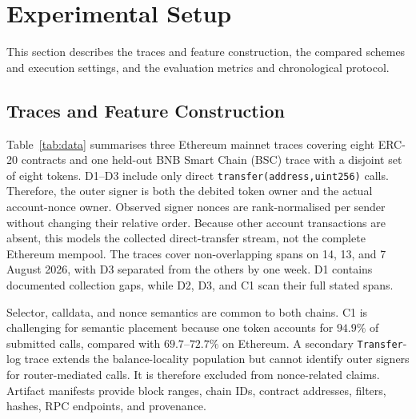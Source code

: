 \documentclass[runningheads]{llncs}
\begin{document}
\section{Experimental Setup}
\label{sec:setup}
\label{sec:method}

This section describes the traces and feature construction, the compared
schemes and execution settings, and the evaluation metrics and chronological
protocol.

\subsection{Traces and Feature Construction}

Table~\ref{tab:data} summarises three Ethereum mainnet traces covering eight
ERC-20 contracts and one held-out BNB Smart Chain (BSC) trace with a disjoint set of
eight tokens. D1--D3 include only direct
\texttt{transfer(address,uint256)} calls. Therefore, the outer signer is both
the debited token owner and the actual account-nonce owner. Observed signer
nonces are rank-normalised per sender without changing their relative order.
Because other account transactions are absent, this models the collected
direct-transfer stream, not the complete Ethereum mempool. The traces cover
non-overlapping spans on 14, 13, and 7 August 2026, with D3 separated from the
others by one week. D1 contains documented collection gaps, while D2, D3, and
C1 scan their full stated spans.

Selector, calldata, and nonce semantics are common to both chains. C1 is
challenging for semantic placement because one
token accounts for $94.9\%$ of submitted calls, compared with
$69.7$--$72.7\%$ on Ethereum. A secondary \texttt{Transfer}-log trace extends
the balance-locality population but cannot identify outer signers for
router-mediated calls. It is therefore excluded from nonce-related claims.
Artifact manifests provide block ranges, chain IDs, contract addresses,
filters, hashes, RPC endpoints, and provenance.
\end{document}
